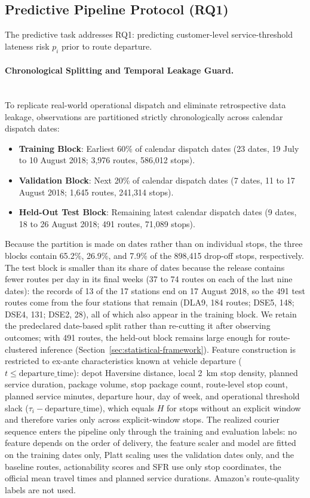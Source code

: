 \documentclass[11pt,a4paper]{article}
\begin{document}
\subsection{Predictive Pipeline Protocol (RQ1)}\label{sec:rq1-protocol}
The predictive task addresses RQ1: predicting customer-level service-threshold lateness risk $p_i$ prior to route departure.

\paragraph{Chronological Splitting and Temporal Leakage Guard.}\mbox{}\\
To replicate real-world operational dispatch and eliminate retrospective data leakage, observations are partitioned strictly chronologically across calendar dispatch dates:
\begin{itemize}
    \item \textbf{Training Block}: Earliest 60\% of calendar dispatch dates (23 dates, 19 July to 10 August 2018; 3,976 routes, 586,012 stops).
    \item \textbf{Validation Block}: Next 20\% of calendar dispatch dates (7 dates, 11 to 17 August 2018; 1,645 routes, 241,314 stops).
    \item \textbf{Held-Out Test Block}: Remaining latest calendar dispatch dates (9 dates, 18 to 26 August 2018; 491 routes, 71,089 stops).
\end{itemize}
Because the partition is made on dates rather than on individual stops, the three blocks contain 65.2\%, 26.9\%, and 7.9\% of the 898,415 drop-off stops, respectively. The test block is smaller than its share of dates because the release contains fewer routes per day in its final weeks (37 to 74 routes on each of the last nine dates): the records of 13 of the 17 stations end on 17 August 2018, so the 491 test routes come from the four stations that remain (DLA9, 184 routes; DSE5, 148; DSE4, 131; DSE2, 28), all of which also appear in the training block. We retain the predeclared date-based split rather than re-cutting it after observing outcomes; with 491 routes, the held-out block remains large enough for route-clustered inference (Section~\ref{sec:statistical-framework}).
Feature construction is restricted to ex-ante characteristics known at vehicle departure ($t \le \text{departure\_time}$): depot Haversine distance, local 2~km stop density, planned service duration, package volume, stop package count, route-level stop count, planned service minutes, departure hour, day of week, and operational threshold slack ($\tau_i - \text{departure\_time}$), which equals $H$ for stops without an explicit window and therefore varies only across explicit-window stops. The realized courier sequence enters the pipeline only through the training and evaluation labels: no feature depends on the order of delivery, the feature scaler and model are fitted on the training dates only, Platt scaling uses the validation dates only, and the baseline routes, actionability scores and SFR use only stop coordinates, the official mean travel times and planned service durations. Amazon's route-quality labels are not used.
\end{document}
